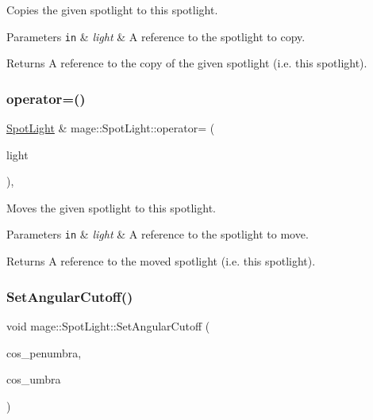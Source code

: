 Copies the given spotlight to this spotlight.


\begin{DoxyParams}[1]{Parameters}
\mbox{\tt in}  & {\em light} & A reference to the spotlight to copy. \\
\hline
\end{DoxyParams}
\begin{DoxyReturn}{Returns}
A reference to the copy of the given spotlight (i.\+e. this spotlight). 
\end{DoxyReturn}
\hypertarget{classmage_1_1_spot_light_a4a618538ddc977e4c81be098b35ed2ac}{}\label{classmage_1_1_spot_light_a4a618538ddc977e4c81be098b35ed2ac} 
\subsubsection{\texorpdfstring{operator=()}{operator=()}\hspace{0.1cm}{\footnotesize\ttfamily [2/2]}}
{\footnotesize\ttfamily \hyperlink{classmage_1_1_spot_light}{Spot\+Light} \& mage\+::\+Spot\+Light\+::operator= (\begin{DoxyParamCaption}\item[{\hyperlink{classmage_1_1_spot_light}{Spot\+Light} \&\&}]{light }\end{DoxyParamCaption})\hspace{0.3cm}{\ttfamily [default]}, {\ttfamily [noexcept]}}

Moves the given spotlight to this spotlight.


\begin{DoxyParams}[1]{Parameters}
\mbox{\tt in}  & {\em light} & A reference to the spotlight to move. \\
\hline
\end{DoxyParams}
\begin{DoxyReturn}{Returns}
A reference to the moved spotlight (i.\+e. this spotlight). 
\end{DoxyReturn}
\hypertarget{classmage_1_1_spot_light_aff7fad222e3c8e41d6fbeeea7f3a0893}{}\label{classmage_1_1_spot_light_aff7fad222e3c8e41d6fbeeea7f3a0893} 
\subsubsection{\texorpdfstring{Set\+Angular\+Cutoff()}{SetAngularCutoff()}}
{\footnotesize\ttfamily void mage\+::\+Spot\+Light\+::\+Set\+Angular\+Cutoff (\begin{DoxyParamCaption}\item[{\hyperlink{namespacemage_aa97e833b45f06d60a0a9c4fc22ae02c0}{F32}}]{cos\+\_\+penumbra,  }\item[{\hyperlink{namespacemage_aa97e833b45f06d60a0a9c4fc22ae02c0}{F32}}]{cos\+\_\+umbra }\end{DoxyParamCaption})\hspace{0.3cm}{\ttfamily [noexcept]}}

